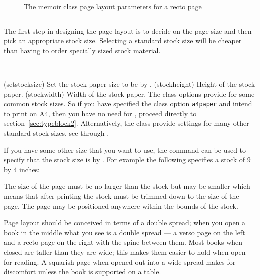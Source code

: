 \begin{figure}
\centering
\drawstock
\caption{The \textsf{memoir} class page layout parameters for a recto page} \label{fig:oddstock}
\end{figure}


\fancybreak{}


    The first step in designing the page layout 
is to decide on the page size and then pick an 
appropriate stock size. Selecting a standard 
stock size will
be cheaper than having to order specially sized stock material. 

\begin{syntax}
\cmd{\setstocksize} \\
\end{syntax}
\glossary(setstocksize)%
  {}%
  {Set the stock paper size to be  by .}
\glossary(stockheight)%
  {}%
  {Height of the stock paper.}
\glossary(stockwidth)%
  {}%
  {Width of the stock paper.}
    The class options 
provide for some common stock sizes. 
So if you have specified the class option \texttt{a4paper} and intend
to print on A4, then you have no need for \cmd{\setstocksize}, proceed
directly to section~\ref{sec:typeblock2}. Alternatively, the class
provide settings for many other standard stock sizes, see
 through . 


If you have some other size that you want to use, the 
command \cmd{\setstocksize} can be used to
specify that the stock size is 
  by . 
For example the following specifies a stock of 9 by 4 inches:
\begin{lcode}
\setstocksize{9in}{4in}
\end{lcode}

The size of the page must be no larger than the 
stock but 
may be smaller which means that after printing
the stock must be trimmed down to the size of the page.
The page may 
be positioned anywhere within the bounds of the stock.

    Page layout should be conceived in terms of a double spread;
when you open a book in the middle what you see is a double spread --- 
a verso page on the left and a recto page on the right with the spine 
between them. Most books when closed are taller 
than they are wide; this makes them easier to hold when open
for reading. A squarish page when opened out into a wide spread 
makes for discomfort unless the book is supported on a table.

